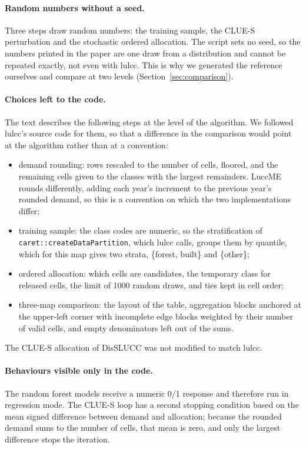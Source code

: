 \paragraph{Random numbers without a seed.} Three steps draw random numbers: the training
sample, the CLUE-S perturbation and the stochastic ordered allocation. The script sets
no seed, so the numbers printed in the paper are one draw from a distribution and
cannot be repeated exactly, not even with lulcc. This is why we generated the
reference ourselves and compare at two levels (Section~\ref{sec:comparison}).

\paragraph{Choices left to the code.} The text describes the following steps at the
level of the algorithm. We followed lulcc's source code for them, so that a difference
in the comparison would point at the algorithm rather than at a convention:
\begin{itemize}
  \item demand rounding: rows rescaled to the number of cells, floored, and the
    remaining cells given to the classes with the largest remainders. LuccME rounds
    differently, adding each year's increment to the previous year's rounded demand, so
    this is a convention on which the two implementations differ;
  \item training sample: the class codes are numeric, so the stratification of
    \texttt{caret::}\allowbreak\texttt{createDataPartition}, which lulcc calls, groups
    them by quantile, which for this map gives two strata, \{forest, built\} and
    \{other\};
  \item ordered allocation: which cells are candidates, the temporary class for
    released cells, the limit of 1000 random draws, and ties kept in cell order;
  \item three-map comparison: the layout of the table, aggregation blocks anchored at
    the upper-left corner with incomplete edge blocks weighted by their number of
    valid cells, and empty denominators left out of the sums.
\end{itemize}
The CLUE-S allocation of DisSLUCC was not modified to match lulcc.

\paragraph{Behaviours visible only in the code.} The random forest models receive a
numeric 0/1 response and therefore run in regression mode. The CLUE-S loop has a second
stopping condition based on the mean signed difference between demand and allocation;
because the rounded demand sums to the number of cells, that mean is zero, and only the
largest difference stops the iteration.

